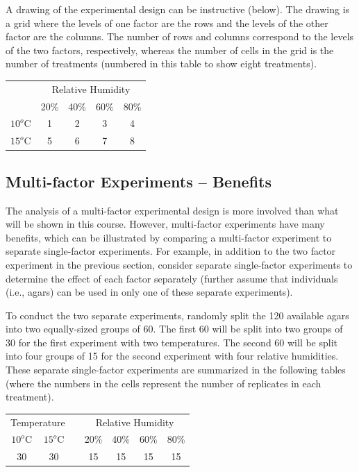 \documentclass[10pt,openany]{book}\usepackage[]{graphicx}\usepackage[]{color}
\begin{document}
A drawing of the experimental design can be instructive (below). The drawing is a grid where the levels of one factor are the rows and the levels of the other factor are the columns. The number of rows and columns correspond to the levels of the two factors, respectively, whereas the number of cells in the grid is the number of treatments (numbered in this table to show eight treatments).

\begin{center}
\begin{tabular}{cc|c|c|c}
 & \multicolumn{4}{c}{Relative Humidity} \\
\cline{2-5}
 & 20\% & 40\% & 60\% & 80\% \\
\cline{2-5}
\multicolumn{1}{c|}{$10^{o}$C} & 1 & 2 & 3 & \multicolumn{1}{c|}{4} \\
\hline
\multicolumn{1}{c|}{$15^{o}$C} & 5 & 6 & 7 & \multicolumn{1}{c|}{8} \\
\cline{2-5}
\end{tabular}
\end{center}


\subsection{Multi-factor Experiments -- Benefits}
The analysis of a multi-factor experimental design is more involved than what will be shown in this course. However, multi-factor experiments have many benefits, which can be illustrated by comparing a multi-factor experiment to separate single-factor experiments. For example, in addition to the two factor experiment in the previous section, consider separate single-factor experiments to determine the effect of each factor separately (further assume that individuals (i.e., agars) can be used in only one of these separate experiments).

To conduct the two separate experiments, randomly split the 120 available agars into two equally-sized groups of 60. The first 60 will be split into two groups of 30 for the first experiment with two temperatures. The second 60 will be split into four groups of 15 for the second experiment with four relative humidities. These separate single-factor experiments are summarized in the following tables (where the numbers in the cells represent the number of replicates in each treatment).

\begin{center}
\begin{tabular}{|c|c|c|c|c|c|c|}
\multicolumn{2}{c}{Temperature} & \multicolumn{1}{c}{} & \multicolumn{4}{c}{Relative Humidity} \\
\cline{1-2}\cline{4-7}
$10^{o}$C & $15^{o}$C & & 20\% & 40\% & 60\% & 80\% \\
\cline{1-2}\cline{4-7}
30 & 30 & & 15 & 15 & 15 & 15 \\
\cline{1-2}\cline{4-7}
\end{tabular}
\end{center}
\end{document}
